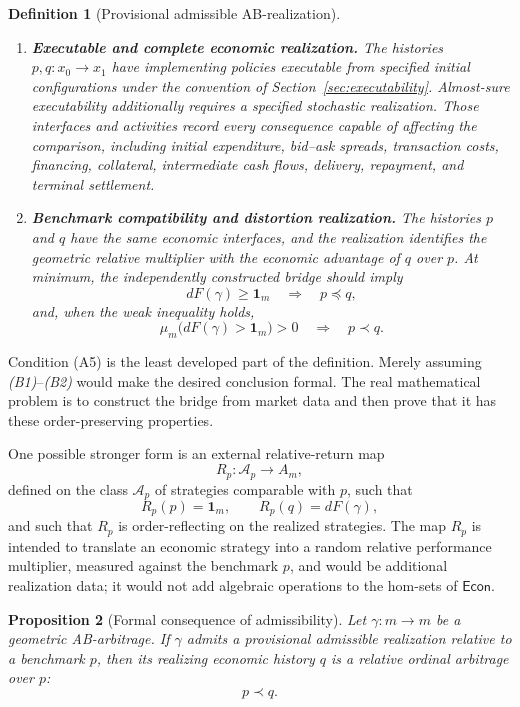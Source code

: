 \documentclass[11pt,a4paper]{article}
\newtheorem{definition}{Definition}[section]
\newtheorem{proposition}[definition]{Proposition}
\newcommand{\Econ}{\mathsf{Econ}}
\begin{document}
\begin{definition}[Provisional admissible AB-realization]
\begin{enumerate}[label=\textnormal{(A\arabic*)},leftmargin=11mm]
\item \textbf{Executable and complete economic realization.}
The histories \(p,q:x_0\to x_1\) have implementing policies executable
from specified initial configurations under the convention of
Section~\ref{sec:executability}. Almost-sure executability additionally
requires a specified stochastic realization.  Those interfaces and activities record every consequence
capable of affecting the comparison, including initial expenditure,
bid--ask spreads, transaction costs, financing, collateral, intermediate
cash flows, delivery, repayment, and terminal settlement.

\item \textbf{Benchmark compatibility and distortion realization.}
The histories \(p\) and \(q\) have the same economic interfaces, and the
realization identifies the geometric relative multiplier with the economic
advantage of \(q\) over \(p\). At minimum, the independently constructed
bridge should imply
\[
  dF(\gamma)\geq\mathbf1_m
  \quad\Longrightarrow\quad
  p\preceq q,
  \tag{B1}
\]
and, when the weak inequality holds,
\[
  \mu_m\bigl(dF(\gamma)>\mathbf1_m\bigr)>0
  \quad\Longrightarrow\quad
  p\prec q.
  \tag{B2}
\]
\end{enumerate}
\end{definition}

Condition (A5) is the least developed part of the definition. Merely assuming
\emph{(B1)}--\emph{(B2)} would make the desired conclusion formal. The real
mathematical problem is to construct the bridge from market data and then
prove that it has these order-preserving properties.

One possible stronger form is an external relative-return map
\[
  R_p:\mathcal A_p\longrightarrow A_m,
\]
defined on the class \(\mathcal A_p\) of strategies comparable with \(p\),
such that
\[
  R_p(p)=\mathbf1_m,
  \qquad
  R_p(q)=dF(\gamma),
\]
and such that \(R_p\) is order-reflecting on the realized strategies. The map
\(R_p\) is intended to translate an economic strategy into a random relative
performance multiplier, measured against the benchmark \(p\), and would be
additional realization data; it would not add algebraic operations to the
hom-sets of \(\Econ\).

\begin{proposition}[Formal consequence of admissibility]
Let \(\gamma:m\to m\) be a geometric AB-arbitrage. If \(\gamma\) admits
a provisional admissible realization relative to a benchmark \(p\), then
its realizing economic history \(q\) is a relative ordinal arbitrage over
\(p\):
\[
  p\prec q.
\]
\end{proposition}
\end{document}
